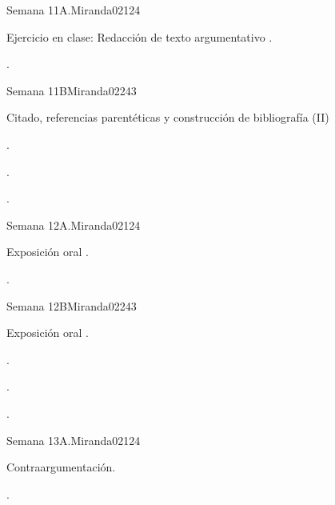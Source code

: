 \begin{syllabus}
\begin{unit}{}{Semana 11A.}{Miranda02}{12}{4}
   \begin{topics}
      \item Ejercicio en clase: Redacción de texto argumentativo .
   \end{topics}
   \begin{learningoutcomes}
      \item . 
   \end{learningoutcomes}
\end{unit}

\begin{unit}{}{Semana 11B}{Miranda02}{24}{3}
   \begin{topics}
      \item Citado, referencias parentéticas y construcción de bibliografía (II)
   \end{topics}

   \begin{learningoutcomes}
      \item . 
      \item .
      \item . 
      \end{learningoutcomes}
\end{unit}

\begin{unit}{}{Semana 12A.}{Miranda02}{12}{4}
   \begin{topics}
      \item Exposición oral .
   \end{topics}
   \begin{learningoutcomes}
      \item . 
   \end{learningoutcomes}
\end{unit}

\begin{unit}{}{Semana 12B}{Miranda02}{24}{3}
   \begin{topics}
      \item Exposición oral .
   \end{topics}

   \begin{learningoutcomes}
      \item . 
      \item .
      \item . 
      \end{learningoutcomes}
\end{unit}

\begin{unit}{}{Semana 13A.}{Miranda02}{12}{4}
   \begin{topics}
      \item Contraargumentación.
   \end{topics}
   \begin{learningoutcomes}
      \item . 
   \end{learningoutcomes}
\end{unit}


\end{syllabus}
